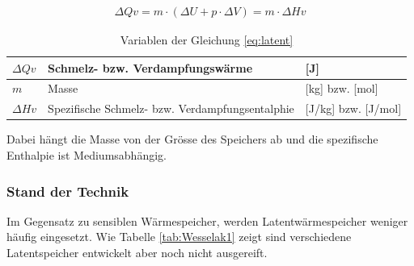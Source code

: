 \documentclass[11pt,a4paper]{scrartcl}
\begin{document}
\begin{align}
\Delta Qv = m \cdot (\Delta U + p \cdot \Delta V) = m \cdot \Delta Hv
\label{eq:latent}
\end{align}

\begin{table}[h!]
\begin{center}
\caption{Variablen der Gleichung \ref{eq:latent}}
\begin{tabular}{|l|p{5cm}|l|}
\hline $\Delta Qv$ & Schmelz- bzw. Verdampfungswärme & [J] \\
\hline $m$ & Masse & [kg] bzw. [mol] \\
\hline $\Delta Hv$ & Spezifische Schmelz- bzw. Verdampfungsentalphie & [J/kg]
bzw. [J/mol] \\
\hline
\end{tabular}
\end{center}
\end{table}

Dabei hängt die Masse von der Grösse des Speichers ab und die spezifische
Enthalpie ist Mediumsabhängig.


\subsubsection{Stand der Technik}
Im Gegensatz zu sensiblen Wärmespeicher, werden Latentwärmespeicher weniger
häufig eingesetzt. Wie Tabelle \ref{tab:Wesselak1} zeigt sind verschiedene
Latentspeicher entwickelt aber noch nicht ausgereift.
\end{document}
